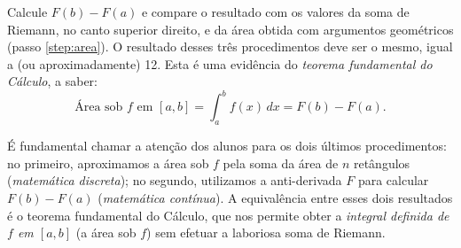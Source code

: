 \documentclass[a4paper,12pt]{scrartcl}
\begin{document}
\begin{list}{.}
      \item Calcule $F(b) - F(a)$ e compare o resultado com os valores da soma de Riemann, no canto superior direito, e da área obtida com argumentos geométricos (passo \ref{step:area}). O resultado desses três procedimentos deve ser o mesmo, igual a (ou aproximadamente) 12. Esta é uma evidência do \emph{teorema fundamental do Cálculo}, a saber:
      \begin{equation*}
       \text{Área sob $f$ em $[a,b]$} = \int_a^b f(x)\,dx = F(b) - F(a).
      \end{equation*}
      
      É fundamental chamar a atenção dos alunos para os dois últimos procedimentos: no primeiro, aproximamos a área sob $f$ pela soma da área de $n$ retângulos (\emph{matemática discreta}); no segundo, utilizamos a anti-derivada $F$ para calcular $F(b) - F(a)$ (\emph{matemática contínua}). A equivalência entre esses dois resultados é o teorema fundamental do Cálculo, que nos permite obter a \emph{integral definida de $f$ em $[a,b]$} (a área sob $f$) sem efetuar a laboriosa soma de Riemann.

    \end{list}
\end{document}
